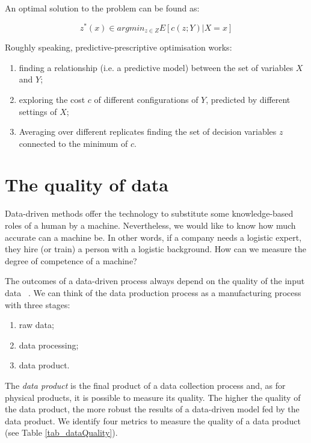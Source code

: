 An optimal solution to the problem can be found as:

\begin{equation}
    z^\ast(x)\in arg min_{z\in Z} E[c(z;Y)|X=x]
\end{equation}

Roughly speaking,  predictive-prescriptive optimisation works:

\begin{enumerate}
    \item finding a relationship (i.e. a predictive model) between  the set of variables $X$ and $Y$;
	\item exploring the cost $c$ of different configurations of $Y$, predicted by different settings of $X$;
	\item Averaging over different replicates finding the set of decision variables $z$ connected to the minimum of $c$.

\end{enumerate}

\section{The quality of data}

Data-driven methods offer the technology to substitute some knowledge-based roles of a human by a machine. Nevertheless, we would like to know how much accurate can a machine be. In other words, if a company needs a logistic expert, they hire (or train) a person with a logistic background. How can we measure the degree of competence of a machine?\par

The outcomes of a data-driven process always depend on the quality of the input data ~\cite{Hazen2014}. We can think of the data production process as a manufacturing process with three stages:

\begin{enumerate}
    \item raw data;
    \item data processing;
    \item data product.

\end{enumerate}

The \textit{data product} is the final product of a data collection process and, as for physical products, it is possible to measure its quality. The higher the quality of the data product, the more robust the results of a data-driven model fed by the data product. We identify four metrics to measure the quality of a data product (see Table \ref{tab_dataQuality}).

